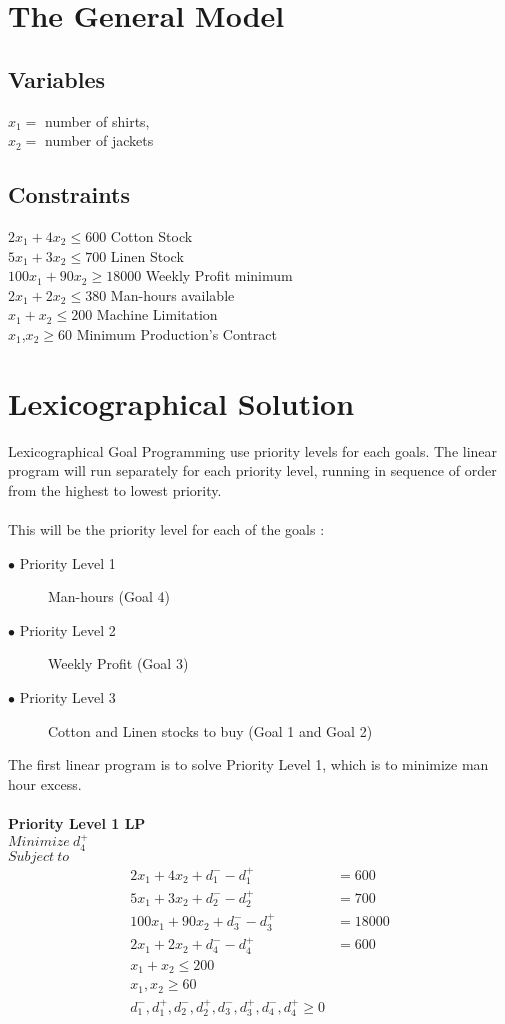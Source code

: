 \documentclass{article}
\begin{document}
\section{The General Model} %
\subsection{Variables}
$x_1 = $ number of shirts, \\
$x_2 = $ number of jackets\\

\subsection{Constraints}
$2x_1 + 4x_2 \leq 600$ Cotton Stock \\
$5x_1 + 3x_2 \leq 700$ Linen Stock \\
$100x_1 + 90x_2 \geq 18000$ Weekly Profit minimum \\
$2x_1 + 2x_2 \leq 380$ Man-hours available \\
$x_1 + x_2 \leq 200$ Machine Limitation \\
$x_1$,$x_2 \geq 60$ Minimum Production's Contract 

\section{Lexicographical Solution}

Lexicographical Goal Programming use priority levels for each goals. The linear program will run separately for each priority level, running in sequence of order from the highest to lowest priority. \\
\\
This will be the priority level for each of the goals :
\begin{description}
  \item[$\bullet$ Priority Level 1] Man-hours (Goal 4)
  \item[$\bullet$ Priority Level 2] Weekly Profit (Goal 3)
  \item[$\bullet$ Priority Level 3] Cotton and Linen stocks to buy (Goal 1 and Goal 2)
\end{description}

The first linear program is to solve Priority Level 1, which is to minimize man hour excess.
\\
\\
\textbf{Priority Level 1 LP}\\
$Minimize \ d_4^{+}$ \\
$Subject \ to$
\begin{align*}
2x_1 + 4x_2 + d_1^{-} - d_1^{+} &= 600\\
5x_1 + 3x_2 + d_2^{-} - d_2^{+} &= 700\\
100x_1 + 90x_2 + d_3^{-} - d_3^{+} &= 18000\\
2x_1 + 2x_2 + d_4^{-} - d_4^{+} &= 600 \\
x_1 + x_2 \leq 200 \\
x_1, x_2 \geq 60 \\
d_1^{-}, d_1^{+}, d_2^{-}, d_2^{+}, d_3^{-}, d_3^{+}, d_4^{-}, d_4^{+} \geq 0
\end{align*}
\end{document}
